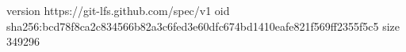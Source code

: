 version https://git-lfs.github.com/spec/v1
oid sha256:bcd78f8ca2c834566b82a3c6fed3e60dfc674bd1410eafe821f569ff2355f5c5
size 349296

